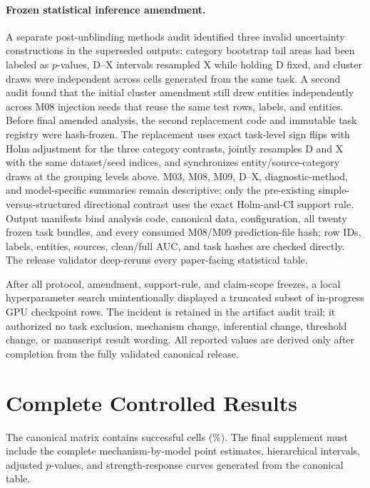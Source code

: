 \documentclass[letterpaper]{article}
\begin{document}
\paragraph{Frozen statistical inference amendment.}
A separate post-unblinding methods audit identified three invalid uncertainty
constructions in the superseded outputs: category bootstrap tail areas had been
labeled as $p$-values, D--X intervals resampled X while holding D fixed, and
cluster draws were independent across cells generated from the same task.  A
second audit found that the initial cluster amendment still drew entities
independently across M08 injection seeds that reuse the same test rows, labels,
and entities.  Before final amended analysis, the second replacement code and
immutable task registry were hash-frozen.  The replacement uses exact task-level sign flips with Holm
adjustment for the three category contrasts, jointly resamples D and X with the
same dataset/seed indices, and synchronizes entity/source-category draws at the
grouping levels above.  M03, M08, M09, D--X, diagnostic-method, and model-specific
summaries remain descriptive; only the pre-existing simple-versus-structured
directional contrast uses the exact Holm-and-CI support rule.  Output manifests
bind analysis code, canonical data, configuration, all twenty frozen task
bundles, and every consumed M08/M09 prediction-file hash; row IDs, labels,
entities, sources, clean/full AUC, and task hashes are checked directly.  The
release validator deep-reruns every paper-facing statistical table.

After all protocol, amendment, support-rule, and claim-scope freezes, a local
hyperparameter search unintentionally displayed a truncated subset of
in-progress GPU checkpoint rows.  The incident is retained in the artifact
audit trail; it authorized no task exclusion, mechanism change, inferential
change, threshold change, or manuscript result wording.  All reported values
are derived only after completion from the fully validated canonical release.

\section{Complete Controlled Results}
\ifLBResultsReady
The canonical matrix contains \LBSuccessfulCells{} successful cells
(\LBCompletionRate\%).  The final supplement must include the complete
mechanism-by-model point estimates, hierarchical intervals, adjusted
$p$-values, and strength-response curves generated from the canonical table.
\end{document}
